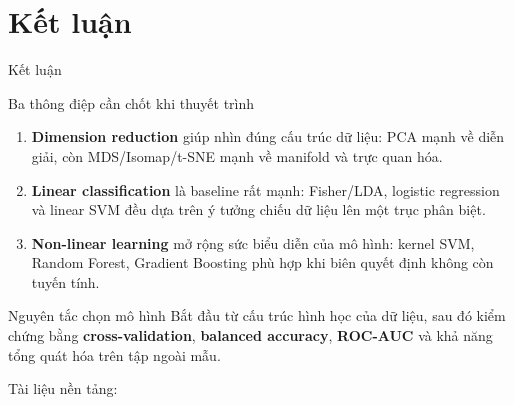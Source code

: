 \section{Kết luận}

\begin{frame}{Kết luận}
    \begin{block}{Ba thông điệp cần chốt khi thuyết trình}
        \begin{enumerate}
            \item \textbf{Dimension reduction} giúp nhìn đúng cấu trúc dữ liệu: PCA mạnh về diễn giải, còn MDS/Isomap/t-SNE mạnh về manifold và trực quan hóa.
            \item \textbf{Linear classification} là baseline rất mạnh: Fisher/LDA, logistic regression và linear SVM đều dựa trên ý tưởng chiếu dữ liệu lên một trục phân biệt.
            \item \textbf{Non-linear learning} mở rộng sức biểu diễn của mô hình: kernel SVM, Random Forest, Gradient Boosting phù hợp khi biên quyết định không còn tuyến tính.
        \end{enumerate}
    \end{block}

    \begin{alertblock}{Nguyên tắc chọn mô hình}
        Bắt đầu từ cấu trúc hình học của dữ liệu, sau đó kiểm chứng bằng \textbf{cross-validation}, \textbf{balanced accuracy}, \textbf{ROC-AUC} và khả năng tổng quát hóa trên tập ngoài mẫu.
    \end{alertblock}

    \hfill{\scriptsize Tài liệu nền tảng: \cite{duchesnay2021statsml}}
\end{frame}
